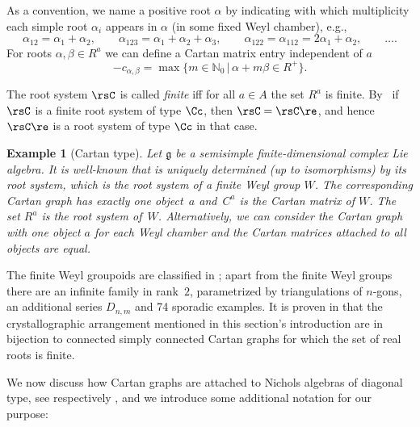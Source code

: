 \documentclass[10pt,a4paper]{amsart}
\numberwithin{equation}{section}
\newtheorem{ese}[teo]{Example}
\newcommand{\N}{\mathbb{N}}
\newcommand{\g}{\mathfrak{g}}
\begin{document}
As a convention, we name a positive root $\alpha$ by indicating with which multiplicity each simple root $\alpha_i$ appears in $\alpha$ (in some fixed Weyl chamber), e.g.,
\[\alpha_{12}=\alpha_1+\alpha_2,\qquad
\alpha_{123}=\alpha_1+\alpha_2+\alpha_3,\qquad
\alpha_{12 2}=\alpha_{112}=2\alpha_1+\alpha_2, \qquad \dots.\]
For roots $\alpha,\beta\in R^a$ we can define a Cartan matrix entry independent of $a$
 \[-c_{\alpha,\beta}=\max \{m\in\N_0\,|\,\alpha+m\beta \in R^+\}.\]

The root system $\rsC $ is called \textit{finite} iff for all $a\in A$ the
set $R^a$ is finite. By~\cite{CH09} if $\rsC $ is a finite root system
of type $\Cc $, then $\rsC =\rsC \re $, and hence $\rsC \re $ is a root
system of type $\Cc$ in that case.

\begin{ese}[Cartan type]Let $\g$ be a semisimple finite-dimensional complex Lie algebra. It is well-known that is uniquely determined (up to isomorphisms) by its root system, which is the root system of a finite Weyl group $W$. The corresponding Cartan graph has exactly one object~$a$ and~$C^a$ is the Cartan matrix of $W$. The set $R^a$ is the root system of~$W$. Alternatively, we can consider the Cartan graph with one object $a$ for each Weyl chamber and the Cartan matrices attached to all objects are equal.
\end{ese}

 The finite Weyl groupoids are classified in \cite{CH09, CH10}; apart from the finite Weyl groups there are an infinite family in rank~$2$, parametrized by triangulations of $n$-gons, an additional series $D_{n,m}$ and 74 sporadic examples.
 It is proven in \cite[Theorem~1.1]{Cun10} that the crystallographic arrangement mentioned in this section's introduction are in bijection to connected simply connected Cartan graphs for which the set of real roots is finite.

We now discuss how Cartan graphs are attached to Nichols algebras of diagonal type, see \cite[Section~3.3]{Heck07} respectively \cite[Chapter~15]{HS20}, and we introduce some additional notation for our purpose:
\end{document}
